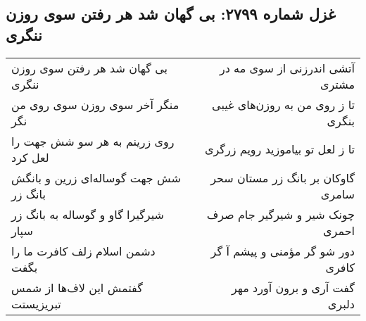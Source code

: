 \begin{center}
\section*{غزل شماره ۲۷۹۹: بی گهان شد هر رفتن سوی روزن ننگری}
\label{sec:2799}
\begin{longtable}{l p{0.5cm} r}
بی گهان شد هر رفتن سوی روزن ننگری
&&
آتشی اندرزنی از سوی مه در مشتری
\\
منگر آخر سوی روزن سوی روی من نگر
&&
تا ز روی من به روزن‌های غیبی بنگری
\\
روی زرینم به هر سو شش جهت را لعل کرد
&&
تا ز لعل تو بیاموزید رویم زرگری
\\
شش جهت گوساله‌ای زرین و بانگش بانگ زر
&&
گاوکان بر بانگ زر مستان سحر سامری
\\
شیرگیرا گاو و گوساله به بانگ زر سپار
&&
چونک شیر و شیرگیر جام صرف احمری
\\
دشمن اسلام زلف کافرت ما را بگفت
&&
دور شو گر مؤمنی و پیشم آ گر کافری
\\
گفتمش این لاف‌ها از شمس تبریزیستت
&&
گفت آری و برون آورد مهر دلبری
\\
\end{longtable}
\end{center}
